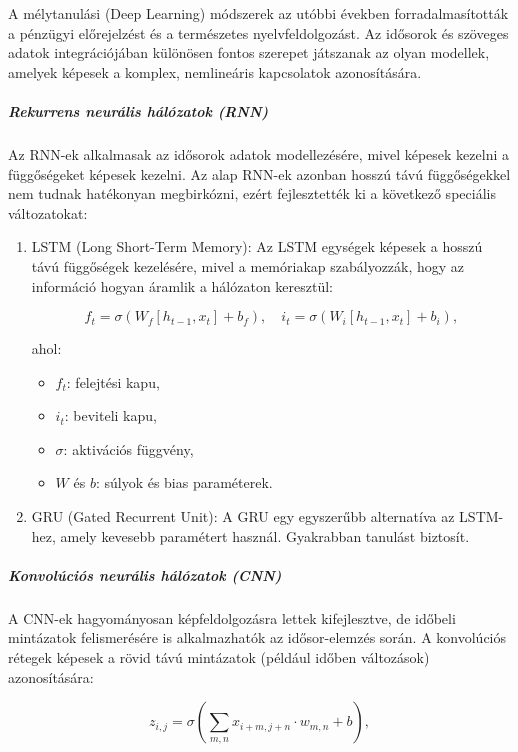 \documentclass[11pt]{article}
\providecommand{\tightlist}{%
      \setlength{\itemsep}{0pt}\setlength{\parskip}{0pt}}
\begin{document}
A mélytanulási (Deep Learning) módszerek az utóbbi években
forradalmasították a pénzügyi előrejelzést és a természetes
nyelvfeldolgozást. Az idősorok és szöveges adatok integrációjában
különösen fontos szerepet játszanak az olyan modellek, amelyek képesek a
komplex, nemlineáris kapcsolatok azonosítására.

\subparagraph{Rekurrens neurális hálózatok
(RNN)}\label{rekurrens-neuruxe1lis-huxe1luxf3zatok-rnn}

Az RNN-ek alkalmasak az idősorok adatok modellezésére, mivel képesek
kezelni a függőségeket képesek kezelni. Az alap RNN-ek azonban hosszú
távú függőségekkel nem tudnak hatékonyan megbirkózni, ezért
fejlesztették ki a következő speciális változatokat:

\begin{enumerate}
\def\labelenumi{\arabic{enumi}.}
\item
  LSTM (Long Short-Term Memory): Az LSTM egységek képesek a hosszú távú
  függőségek kezelésére, mivel a memóriakap szabályozzák, hogy az
  információ hogyan áramlik a hálózaton keresztül:

  \[f_t = \sigma(W_f[h_{t-1}, x_t] + b_f),\quad i_t = \sigma(W_i[h_{t-1}, x_t] + b_i),\]

  ahol:

  \begin{itemize}
  \tightlist
  \item
    \(f_t\): felejtési kapu,
  \item
    \(i_t\): beviteli kapu,
  \item
    \(\sigma\): aktivációs függvény,
  \item
    \(W\) és \(b\): súlyok és bias paraméterek.
  \end{itemize}
\item
  GRU (Gated Recurrent Unit): A GRU egy egyszerűbb alternatíva az
  LSTM-hez, amely kevesebb paramétert használ. Gyakrabban tanulást
  biztosít.
\end{enumerate}

\subparagraph{Konvolúciós neurális hálózatok
(CNN)}\label{konvoluxfaciuxf3s-neuruxe1lis-huxe1luxf3zatok-cnn}

A CNN-ek hagyományosan képfeldolgozásra lettek kifejlesztve, de időbeli
mintázatok felismerésére is alkalmazhatók az idősor-elemzés során. A
konvolúciós rétegek képesek a rövid távú mintázatok (például időben
változások) azonosítására:

\[z_{i,j} = \sigma\left(\sum_{m,n} x_{i+m,j+n} \cdot w_{m,n} + b\right),\]
\end{document}
